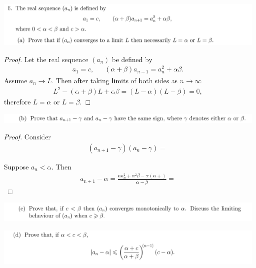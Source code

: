 \documentclass[12pt]{article}
\begin{document}
\newpage
\subsection{}
\begin{mdframed}
\includegraphics[width=400pt]{img/oxford-M2-analysis-I-4-6-a.png}
\end{mdframed}

\begin{proof}
  Let the real sequence $(a_n)$ be defined by
  \begin{align*}
    a_1 = c,  ~~~~~~~ (\alpha + \beta)a_{n+1} = a_n^2 + \alpha\beta.
  \end{align*}
  Assume $a_n \to L$. Then after taking limits of both sides as $n \to \infty$
  \begin{align*}
    L^2 - (\alpha + \beta)L + \alpha\beta = (L - \alpha)(L - \beta) = 0,
  \end{align*}
  therefore $L = \alpha$ or $L = \beta$.
\end{proof}

\begin{mdframed}
\includegraphics[width=400pt]{img/oxford-M2-analysis-I-4-6-b.png}
\end{mdframed}

\begin{proof}
  Consider
  \begin{align*}
    (a_{n+1} - \gamma)(a_n - \gamma) = \frac{}{}
  \end{align*}

  Suppose $a_n < \alpha$. Then
  \begin{align*}
    a_{n+1} - \alpha = \frac{\alpha a_n^2 + \alpha^2\beta - \alpha(\alpha + )}{\alpha + \beta} =
  \end{align*}
\end{proof}

\begin{mdframed}
\includegraphics[width=400pt]{img/oxford-M2-analysis-I-4-6-c.png}
\end{mdframed}
\begin{mdframed}
\includegraphics[width=400pt]{img/oxford-M2-analysis-I-4-6-d.png}
\end{mdframed}
\end{document}
